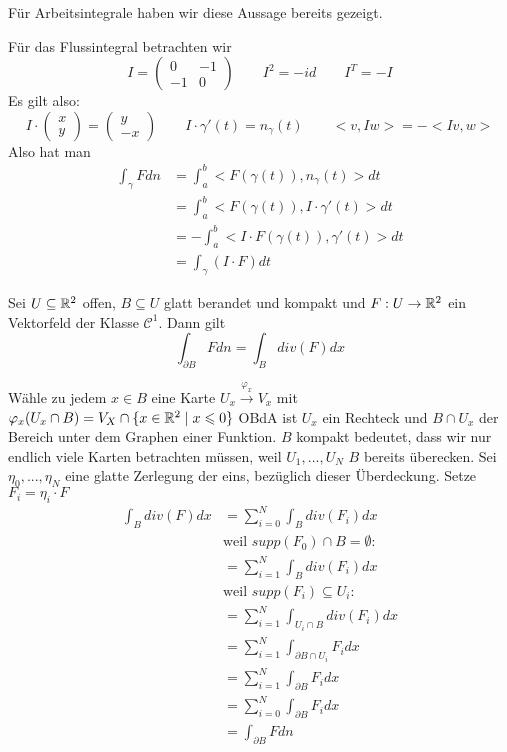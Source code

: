 \documentclass[main.tex]{subfiles}
\begin{document}
\begin{Beweis}
  Für Arbeitsintegrale haben wir diese Aussage bereits gezeigt.

  Für das Flussintegral betrachten wir
  $$I = \begin{pmatrix}
    0 & -1 \\ -1 & 0
  \end{pmatrix} \qquad I^2 = - id \qquad I^T = -I$$
  Es gilt also:
  $$I \cdot \begin{pmatrix}
    x \\ y
  \end{pmatrix} = \begin{pmatrix}
    y \\ -x
  \end{pmatrix} \qquad I \cdot \gamma'(t) = n_\gamma(t) \qquad <v,Iw> = -<Iv,w>$$
  Also hat man
  $$\begin{aligned}
    \int_\gamma F dn & = \int_a^b <F(\gamma(t)),n_\gamma(t)> dt \\
    & = \int_a^b <F(\gamma(t)),I \cdot \gamma'(t)> dt \\
    & = -\int_a^b <I \cdot F(\gamma(t)),\gamma'(t)> dt \\
    & = \int_\gamma(I\cdot F) dt
  \end{aligned}$$
\end{Beweis}

\begin{Theorem}
  Sei $U \subseteq \mathbb{R}^2$ offen, $B \subseteq U$ glatt berandet und kompakt und $F: U \to \mathbb{R}^2$ ein Vektorfeld der Klasse $\mathcal{C}^1$. Dann gilt
  $$\int_{\partial B} Fdn = \int_B div(F) dx$$
\end{Theorem}

\begin{Beweis}
  Wähle zu jedem $x \in B$ eine Karte $U_x \stackrel{\scriptscriptstyle \varphi_x}{\longrightarrow} V_x$ mit $\varphi_x(U_x \cap B) = V_X \cap \{x \in \mathbb{R}^2 \mid x \leqslant 0 \}$
  OBdA ist $U_x$ ein Rechteck und $B \cap U_x$ der Bereich unter dem Graphen einer Funktion. $B$ kompakt bedeutet, dass wir nur endlich viele Karten betrachten müssen, weil $U_1,...,U_N$ $B$ bereits überecken. Sei $\eta_0,...,\eta_N$ eine glatte Zerlegung der eins, bezüglich dieser Überdeckung. Setze $F_i = \eta_i \cdot F$
  $$\begin{aligned}
    \int_B div(F) dx & = \sum \limits_{i = 0}^N \int_B div(F_i) dx \\
    & \text{weil } supp(F_0) \cap B = \emptyset :\\
    & = \sum \limits_{i = 1}^N \int_B div(F_i) dx \\
    & \text{weil } supp(F_i) \subseteq U_i :\\
    & = \sum \limits_{i = 1}^N \int_{U_i \cap B} div(F_i) dx \\
    & = \sum \limits_{i = 1}^N \int_{\partial B \cap U_i} F_i dx \\
    & = \sum \limits_{i = 1}^N \int_{\partial B} F_i dx \\
    & = \sum \limits_{i = 0}^N \int_{\partial B} F_i dx \\
    & = \int_{\partial B}F dn
  \end{aligned}$$
\end{Beweis}
\end{document}
